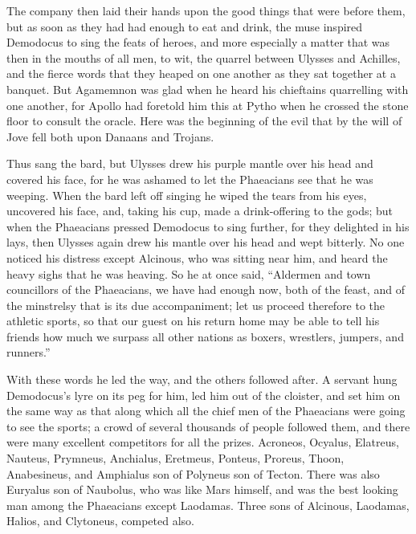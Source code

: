 The company then laid their hands upon the good things that were before them,
but as soon as they had had enough to eat and drink, the muse inspired
Demodocus to sing the feats of heroes, and more especially a matter that was
then in the mouths of all men, to wit, the quarrel between Ulysses and
Achilles, and the fierce words that they heaped on one another as they sat
together at a banquet. But Agamemnon was glad when he heard his chieftains
quarrelling with one another, for Apollo had foretold him this at Pytho when he
crossed the stone floor to consult the oracle. Here was the beginning of the
evil that by the will of Jove fell both upon Danaans and Trojans.

Thus sang the bard, but Ulysses drew his purple mantle over his head and
covered his face, for he was ashamed to let the Phaeacians see that he was
weeping. When the bard left off singing he wiped the tears from his eyes,
uncovered his face, and, taking his cup, made a drink-offering to the gods; but
when the Phaeacians pressed Demodocus to sing further, for they delighted in
his lays, then Ulysses again drew his mantle over his head and wept bitterly.
No one noticed his distress except Alcinous, who was sitting near him, and
heard the heavy sighs that he was heaving. So he at once said, “Aldermen and
town councillors of the Phaeacians, we have had enough now, both of the feast,
and of the minstrelsy that is its due accompaniment; let us proceed therefore
to the athletic sports, so that our guest on his return home may be able to
tell his friends how much we surpass all other nations as boxers, wrestlers,
jumpers, and runners.”

With these words he led the way, and the others followed after. A servant hung
Demodocus’s lyre on its peg for him, led him out of the cloister, and set him
on the same way as that along which all the chief men of the Phaeacians were
going to see the sports; a crowd of several thousands of people followed them,
and there were many excellent competitors for all the prizes. Acroneos,
Ocyalus, Elatreus, Nauteus, Prymneus, Anchialus, Eretmeus, Ponteus, Proreus,
Thoon, Anabesineus, and Amphialus son of Polyneus son of Tecton. There was also
Euryalus son of Naubolus, who was like Mars himself, and was the best looking
man among the Phaeacians except Laodamas. Three sons of Alcinous, Laodamas,
Halios, and Clytoneus, competed also.

